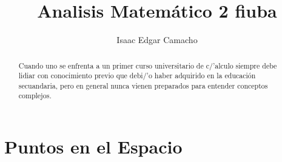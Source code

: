 \documentclass[a4paper,16pt]{article}
\title{Analisis Matem\'atico 2 fiuba}
\author{Isaac Edgar Camacho}
\begin{document}
\maketitle

\begin{abstract}
Cuando uno se enfrenta a un primer curso universitario de c/'alculo siempre debe lidiar con conocimiento previo que debi/'o haber adquirido en la educaci\'on secuandaria, pero en general nunca vienen preparados para entender conceptos complejos.

\end{abstract}

\tableofcontents

\section{Puntos en el Espacio}
\end{document}
